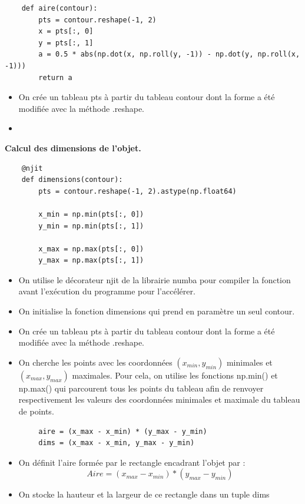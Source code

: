 \documentclass[titlepage]{article}
\begin{document}
	\begin{lstlisting}
	def aire(contour):  
		pts = contour.reshape(-1, 2)
		x = pts[:, 0]
		y = pts[:, 1]
		a = 0.5 * abs(np.dot(x, np.roll(y, -1)) - np.dot(y, np.roll(x, -1)))
		return a
	\end{lstlisting}
	\begin{itemize}
		\item 
		On crée un tableau pts à partir du tableau contour dont la forme a été modifiée avec la méthode .reshape.
		\item 
		
	\end{itemize}
	\textbf{Calcul des dimensions de l'objet.}
	\begin{lstlisting}
	@njit
	def dimensions(contour):
		pts = contour.reshape(-1, 2).astype(np.float64)
	
		x_min = np.min(pts[:, 0])
		y_min = np.min(pts[:, 1])
		
		x_max = np.max(pts[:, 0])
		y_max = np.max(pts[:, 1])
	\end{lstlisting}
	\begin{itemize}
		\item
		On utilise le décorateur njit de la librairie numba pour compiler la fonction avant l'exécution du programme pour l'accélérer.
		\item 
		On initialise la fonction dimensions qui prend en paramètre un seul contour.
		\item 
		On crée un tableau pts à partir du tableau contour dont la forme a été modifiée avec la méthode .reshape.
		\item 
		On cherche les points avec les coordonnées $(x_{min},y_{min})$ minimales et $(x_{max},y_{max})$ maximales. Pour cela, on utilise les fonctions np.min() et np.max() qui parcourent tous les points du tableau afin de renvoyer respectivement les valeurs des coordonnées minimales et maximale du tableau de points.
	\end{itemize}
	\begin{lstlisting}
		aire = (x_max - x_min) * (y_max - y_min)
		dims = (x_max - x_min, y_max - y_min)
	\end{lstlisting}
	\begin{itemize}
		\item On définit l'aire formée par le rectangle encadrant l'objet par : $$Aire =(x_{max} - x_{min}) * (y_{max} - y_{min}) $$
		\item
		On stocke la hauteur et la largeur de ce rectangle dans un tuple dims 
	\end{itemize}
\end{document}

